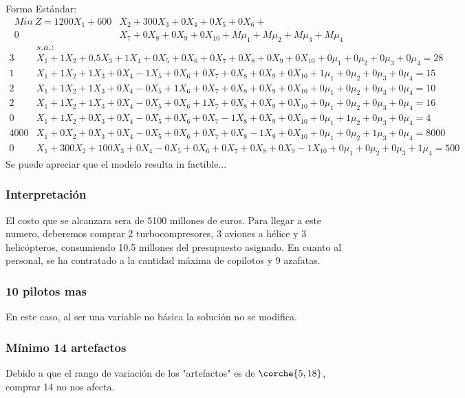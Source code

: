 \begin{homeworkProblem}
Forma Estándar:{\footnotesize
\begin{align*}
    Min\ Z = 1200X_1 + 600&X_2 + 300X_3 + 0X_4 + 0X_5 + 0X_6 + \\ 0&X_7 + 0X_8 + 0X_9 + 0X_{10} + M\mu_1 + M\mu_2 + M\mu_3 + M\mu_4
\end{align*}  
\begin{align*} 
    &s.a.: \\ 3&X_1 + 1X_2 + 0.5X_3 + 1X_4 + 0X_5 + 0X_6 + 0X_7 + 0X_8 + 0X_9 + 0X_{10} + 0\mu_1 + 0\mu_2 + 0\mu_3 + 0\mu_4  = 28 \\
    1&X_1 + 1X_2 + 1X_3 + 0X_4 - 1X_5 + 0X_6 + 0X_7 + 0X_8 + 0X_9 + 0X_{10} + 1\mu_1 + 0\mu_2 + 0\mu_3 + 0\mu_4  = 15 \\
    2&X_1 + 1X_2 + 1X_3 + 0X_4 - 0X_5 + 1X_6 + 0X_7 + 0X_8 + 0X_9 + 0X_{10} + 0\mu_1 + 0\mu_2 + 0\mu_3 + 0\mu_4  = 10 \\
    2&X_1 + 1X_2 + 1X_3 + 0X_4 - 0X_5 + 0X_6 + 1X_7 + 0X_8 + 0X_9 + 0X_{10} + 0\mu_1 + 0\mu_2 + 0\mu_3 + 0\mu_4  = 16 \\
    0&X_1 + 1X_2 + 0X_3 + 0X_4 - 0X_5 + 0X_6 + 0X_7 - 1X_8 + 0X_9 + 0X_{10} + 0\mu_1 + 1\mu_2 + 0\mu_3 + 0\mu_4  = 4 \\
    4000&X_1 + 0X_2 + 0X_3 + 0X_4 - 0X_5 + 0X_6 + 0X_7 + 0X_8 - 1X_9 + 0X_{10} + 0\mu_1 + 0\mu_2 + 1\mu_3 + 0\mu_4  = 8000 \\
    0&X_1 + 300X_2 + 100X_3 + 0X_4 - 0X_5 + 0X_6 + 0X_7 + 0X_8 + 0X_9 -  1X_{10} + 0\mu_1 + 0\mu_2 + 0\mu_3 + 1\mu_4  = 500 
\end{align*}}
Se puede apreciar que el modelo resulta in factible...
\subsubsection{Interpretación}
El costo que se alcanzara sera de 5100 millones de euros. Para llegar a este numero, deberemos comprar 2 turbocompresores, 3 aviones a hélice y 3 helicópteros, consumiendo 10.5 millones del presupuesto asignado. En cuanto al personal, se ha contratado a la cantidad máxima de copilotos y 9 azafatas.
\subsubsection{10 pilotos mas}
En este caso, al ser una variable no básica la solución no se modifica.
\subsubsection{Mínimo 14 artefactos}
Debido a que el rango de variación de los "artefactos" es de $\corche{5,18}$, comprar 14 no nos afecta.
\end{homeworkProblem}
